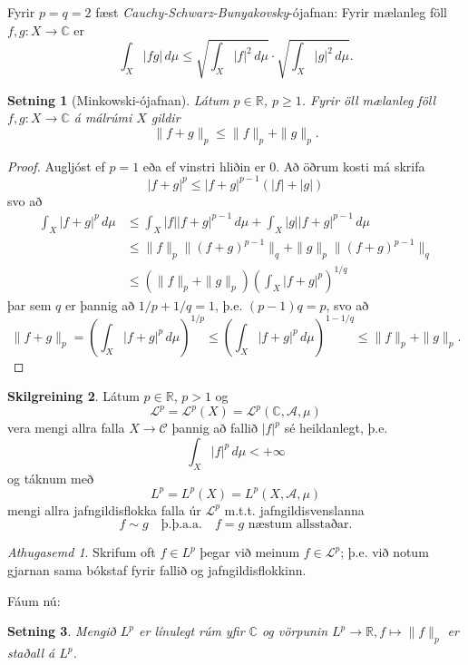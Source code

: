 \documentclass[a4paper,icelandic,11pt]{book}
\theoremstyle{plain}      \newtheorem{setn}{Setning}[chapter]
\theoremstyle{definition} \newtheorem{skilgr}[setn]{Skilgreining}
\theoremstyle{remark}     \newtheorem*{ath}{Athugasemd}
\newcommand{\R}{\mathbb R}
\newcommand{\C}{\mathbb C}
\begin{document}
Fyrir $p=q=2$ fæst
\emph{Cauchy-Schwarz-Bunyakovsky}-ójafnan:
Fyrir mælanleg föll $f,g:X\to\C$ er
\[
\int_{X}|fg|\,d\mu
\le \sqrt{\int_{X}|f|^{2}\,d\mu}\cdot \sqrt{\int_{X}|g|^{2}\,d\mu}.
\]
\begin{setn}
  [Minkowski-ójafnan]
  Látum $p\in\R$, $p\ge 1$. Fyrir öll mælanleg föll $f,g:X\to\C$ á
  málrúmi $X$ gildir
  \[
  \| f + g \|_{p}
  \le \|f\|_{p} + \|g\|_{p}.
  \]
\end{setn}
\begin{proof}
  Augljóst ef $p=1$ eða ef vinstri hliðin er $0$. Að öðrum kosti má
  skrifa
  \[
  |f+g|^{p} \le |f+g|^{p-1}(|f|+|g|)
  \]
  svo að
  \begin{align*}
    \int_{X}|f+g|^{p}\,d\mu
    &\le \int_{X}|f| |f+g|^{p-1}\,d\mu
    + \int_{X}|g| |f+g|^{p-1}\,d\mu
    \\
    &\le \|f\|_{p} \|(f+g)^{p-1}\|_{q}
    + \|g\|_{p} \|(f+g)^{p-1}\|_{q}
    \\
    &\le(\|f\|_{p}+\|g\|_{p})
    \left(
      \int_{X}|f+g|^{p}
    \right)^{1/q}
  \end{align*}
  þar sem $q$ er þannig að $1/p+1/q=1$, þ.e. $(p-1)q=p$, svo að
  \[
  \|f+g\|_{p}
  =
  \left(
    \int_{X}|f+g|^{p}\,d\mu
  \right)^{1/p}
  \le
  \left(
    \int_{X}|f+g|^{p}\,d\mu
  \right)^{1-1/q}
  \le \|f\|_{p}+\|g\|_{p}.
  \]
\end{proof}
\begin{skilgr}
  Látum $p\in\R$, $p>1$ og
  \[
  \mathcal L^{p}
  = \mathcal L^{p}(X)
  = \mathcal{L}^{p}(\C, \mathcal A, \mu)
  \]
  vera mengi allra falla $X\to\mathcal C$ þannig að fallið $|f|^{p}$
  sé heildanlegt, þ.e.
  \[
  \int_{X}|f|^{p}\,d\mu < +\infty
  \]
  og táknum með
  \[
  L^{p} = L^{p}(X) = L^{p}(X,\mathcal A, \mu)
  \]
  mengi allra jafngildisflokka falla úr $\mathcal L^{p}$
  m.t.t. jafngildisvenslanna
  \[
  f\sim g
  \quad\text{þ.þ.a.a.}\quad
  f = g\text{ næstum allsstaðar}.
  \]
\end{skilgr}
\begin{ath}
  Skrifum oft $f\in L^{p}$ þegar við meinum $f\in\mathcal L^{p}$;
  þ.e. við notum gjarnan sama bókstaf fyrir fallið og
  jafngildisflokkinn. 
\end{ath}
Fáum nú:
\begin{setn}
  Mengið $L^{p}$ er línulegt rúm yfir $\C$ og vörpunin $L^{p}\to\R,
  f\mapsto\|f\|_{p}$ er staðall á $L^{p}$.
\end{setn}
\end{document}
